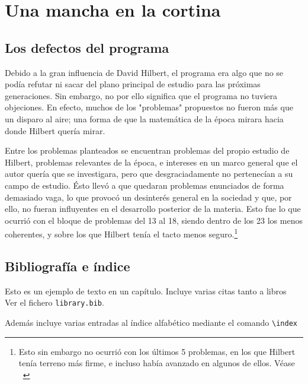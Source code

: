 \chapter{Una mancha en la cortina} \label{ch:Hilbert-2}

\section{Los defectos del programa}

Debido a la gran influencia de David Hilbert, el programa era algo que no se podía refutar ni sacar del plano principal de estudio para las próximas generaciones. Sin embargo,
no por ello significa que el programa no tuviera objeciones. En efecto, muchos de los "problemas" propuestos no fueron más que un disparo al aire; una forma de que la matemática 
de la época mirara hacia donde Hilbert quería mirar. 

Entre los problemas planteados se encuentran problemas del propio estudio de Hilbert, problemas relevantes de la época, e intereses en un marco general que el autor quería que se
investigara, pero que desgraciadamente no pertenecían a su campo de estudio. Ésto llevó a que quedaran problemas enunciados de forma demasiado vaga, lo que provocó un desinterés 
general en la sociedad y que, por ello, no fueran influyentes en el desarrollo posterior de la materia. Esto fue lo que ocurrió con el bloque de problemas del 13 al 18, siendo dentro
de los 23 los menos coherentes, y sobre los que Hilbert tenía el tacto menos seguro.\footnote{Esto sin embargo no ocurrió con los últimos 5 problemas, en los que Hilbert tenía terreno
más firme, e incluso había avanzado en algunos de ellos. Véase ~\cite{BREZIS199876}}  



\section{Bibliografía e índice}


Esto es un ejemplo de texto en un capítulo. Incluye varias citas tanto a libros ~\cite{Zach_2007,Fer_Castro_2020,gray2000hilbert,stewart1987problems,gray2003reto,alma991014322964704990} 
Ver el fichero \texttt{library.bib}. 

Además incluye varias entradas al índice alfabético mediante el comando \verb+\index+ 


\endinput
